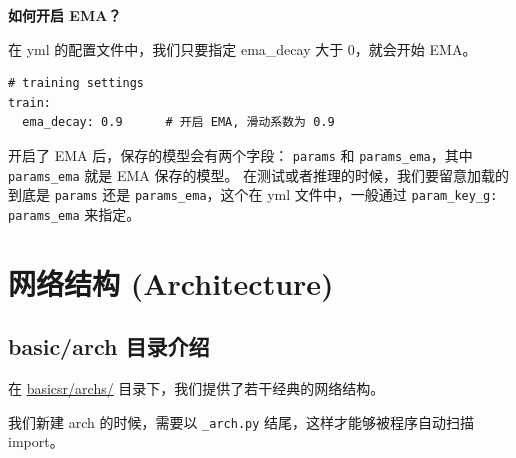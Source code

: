 \documentclass[../main.tex]{subfiles}
\begin{document}
\begin{hl} %
    \textbf{如何开启 EMA？}

    在 yml 的配置文件中，我们只要指定 ema\_decay 大于 0，就会开始 EMA。
    \begin{verbatim}
# training settings
train:
  ema_decay: 0.9      # 开启 EMA, 滑动系数为 0.9
\end{verbatim}
\end{hl}

开启了 EMA 后，保存的模型会有两个字段： \texttt{params} 和 \texttt{params\_ema}，其中  \texttt{params\_ema} 就是 EMA 保存的模型。
在测试或者推理的时候，我们要留意加载的到底是 \texttt{params} 还是 \texttt{params\_ema}，这个在 yml 文件中，一般通过  \texttt{param\_key\_g: params\_ema} 来指定。

\section{网络结构 (Architecture)} \label{code_structure:arch}

\subsection{basic/arch 目录介绍}\label{code_structure:arch_contents}


在 \href{https://github.com/XPixelGroup/BasicSR/tree/master/basicsr/archs}{basicsr/archs/} 目录下，我们提供了若干经典的网络结构。

\vspace{0.5cm}
\renewcommand*\DTstyle{\ttfamily\textcolor{black}}
\vspace{0.5cm}

\begin{hl} %
    我们新建 arch 的时候，需要以 \texttt{\_arch.py} 结尾，这样才能够被程序自动扫描 import。
\end{hl}
\end{document}
